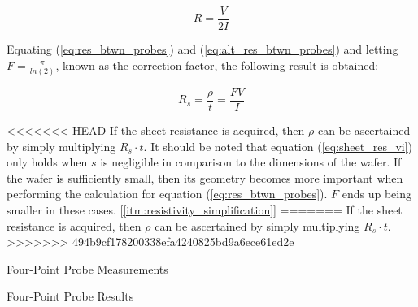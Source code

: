 \documentclass{article}
\begin{document}
\begin{equation}
\label{eq:alt_res_btwn_probes}
R = \frac{V}{2I}
\end{equation}

Equating (\ref{eq:res_btwn_probes}) and (\ref{eq:alt_res_btwn_probes}) and letting $F = \frac{\pi}{ln(2)}$, known as the correction factor, the following result is obtained:

\begin{equation}
\label{eq:sheet_res_vi}
R_s = \frac{\rho}{t} = \frac{ FV }{ I }
\end{equation}

<<<<<<< HEAD
If the sheet resistance is acquired, then $\rho$ can be ascertained by simply multiplying $R_s \cdot t$. It should be noted that equation (\ref{eq:sheet_res_vi}) only holds when $s$ is negligible in comparison to the dimensions of the wafer. If the wafer is sufficiently small, then its geometry becomes more important when performing the calculation for equation (\ref{eq:res_btwn_probes}). $F$ ends up being smaller in these cases. [\ref{itm:resistivity_simplification}] %
=======
If the sheet resistance is acquired, then $\rho$ can be ascertained by simply multiplying $R_s \cdot t$.
>>>>>>> 494b9cf178200338efa4240825bd9a6ece61ed2e


\FloatBarrier

\begin{table}[h!]
	\centering
	\caption{Four-Point Probe Measurements}
	\label{tab:fpp_measure}
\end{table}

\FloatBarrier

\begin{table}[h!]
	\centering
	\caption{Four-Point Probe Results}
	\label{tab:fpp_results}
\end{table}

\FloatBarrier

\FloatBarrier
\end{document}
